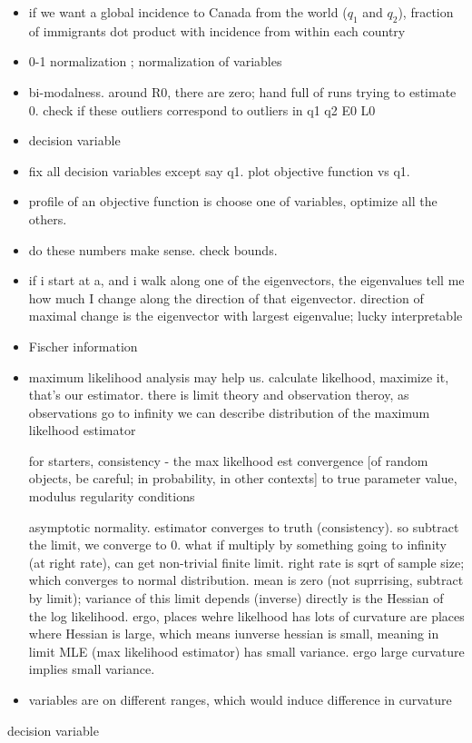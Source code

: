 \documentclass{article}
\begin{document}
\begin{itemize}
	\item if we want a global incidence to Canada from the world ($q_1$ and $q_2$), fraction of immigrants dot product with incidence from within each country
	\item 0-1 normalization ; normalization of variables
	\item bi-modalness. around R0, there are zero; hand full of runs trying to estimate 0.  check if these outliers correspond to outliers in q1 q2 E0 L0
	\item decision variable 
	\item fix all decision variables except say q1. plot objective function vs q1.
	\item profile of an objective function is choose one of variables, optimize all the others. 
	\item do these numbers make sense. check bounds.
	
	\item if i start at a, and i walk along one of the eigenvectors, the eigenvalues tell me how much I change along the direction of that eigenvector.  direction of maximal change is the eigenvector with largest eigenvalue; lucky interpretable 
	
	\item Fischer information
	
	\item maximum likelihood analysis may help us. calculate likelhood, maximize it, that's our estimator.  there is limit theory and observation theroy, as observations go to infinity we can describe distribution of the maximum likelhood estimator 
	
	for starters, consistency - the max likelhood est convergence [of random objects, be careful; in probability, in other contexts] to true parameter value, modulus regularity conditions
	
	asymptotic normality. estimator converges to truth (consistency).  so subtract the limit, we converge to 0.  what if multiply by something going to infinity (at right rate), can get non-trivial finite limit. right rate is sqrt of sample size; which converges to normal distribution.  mean is zero (not suprrising, subtract by limit); variance of this limit depends (inverse) directly is the Hessian of the log likelihood.  ergo, places wehre likelhood has lots of curvature are places where Hessian is large, which means iunverse hessian is small, meaning in limit MLE (max likelihood estimator) has small variance. ergo large curvature implies small variance. 
		
	\item variables are on different ranges, which would induce difference in curvature 	
		
\end{itemize}

decision variable 





\end{document}
